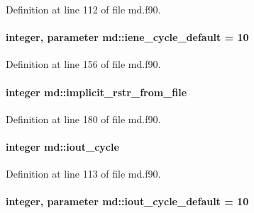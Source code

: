 Definition at line 112 of file md.\-f90.

\hypertarget{classmd_af8c218348f086868b6add7ccec168b29}{
\paragraph[{iene\-\_\-cycle\-\_\-default}]{\setlength{\rightskip}{0pt plus 5cm}integer, parameter md\-::iene\-\_\-cycle\-\_\-default = 10}}\label{classmd_af8c218348f086868b6add7ccec168b29}


Definition at line 156 of file md.\-f90.

\hypertarget{classmd_a1e7dddfa1d19d1bda878d2011984800e}{
\paragraph[{implicit\-\_\-rstr\-\_\-from\-\_\-file}]{\setlength{\rightskip}{0pt plus 5cm}integer md\-::implicit\-\_\-rstr\-\_\-from\-\_\-file}}\label{classmd_a1e7dddfa1d19d1bda878d2011984800e}


Definition at line 180 of file md.\-f90.

\hypertarget{classmd_a1d5559ffcfeaa5988f934be02bedbf7d}{
\paragraph[{iout\-\_\-cycle}]{\setlength{\rightskip}{0pt plus 5cm}integer md\-::iout\-\_\-cycle}}\label{classmd_a1d5559ffcfeaa5988f934be02bedbf7d}


Definition at line 113 of file md.\-f90.

\hypertarget{classmd_af488caf19eab51ce8ce832996e1fa672}{
\paragraph[{iout\-\_\-cycle\-\_\-default}]{\setlength{\rightskip}{0pt plus 5cm}integer, parameter md\-::iout\-\_\-cycle\-\_\-default = 10}}\label{classmd_af488caf19eab51ce8ce832996e1fa672}


